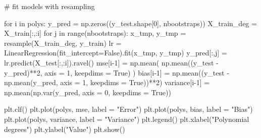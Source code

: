 \documentclass[
  letterpaper,
  DIV=11,
  numbers=noendperiod]{scrartcl}
\newenvironment{Shaded}{\begin{snugshade}}{\end{snugshade}}
\newcommand{\BuiltInTok}[1]{\textcolor[rgb]{0.00,0.23,0.31}{#1}}
\newcommand{\CommentTok}[1]{\textcolor[rgb]{0.37,0.37,0.37}{#1}}
\newcommand{\ControlFlowTok}[1]{\textcolor[rgb]{0.00,0.23,0.31}{#1}}
\newcommand{\DecValTok}[1]{\textcolor[rgb]{0.68,0.00,0.00}{#1}}
\newcommand{\KeywordTok}[1]{\textcolor[rgb]{0.00,0.23,0.31}{#1}}
\newcommand{\NormalTok}[1]{\textcolor[rgb]{0.00,0.23,0.31}{#1}}
\newcommand{\OperatorTok}[1]{\textcolor[rgb]{0.37,0.37,0.37}{#1}}
\newcommand{\StringTok}[1]{\textcolor[rgb]{0.13,0.47,0.30}{#1}}
\newcommand{\VariableTok}[1]{\textcolor[rgb]{0.07,0.07,0.07}{#1}}
\begin{document}
\begin{Shaded}
\begin{Highlighting}[]
\CommentTok{\# fit models with resampling}

\ControlFlowTok{for}\NormalTok{ i }\KeywordTok{in}\NormalTok{ polys:}
\NormalTok{    y\_pred }\OperatorTok{=}\NormalTok{ np.zeros((y\_test.shape[}\DecValTok{0}\NormalTok{], nbootstraps))}
\NormalTok{    X\_train\_deg }\OperatorTok{=}\NormalTok{ X\_train[:,:i]}
    \ControlFlowTok{for}\NormalTok{ j }\KeywordTok{in} \BuiltInTok{range}\NormalTok{(nbootstraps):}
\NormalTok{        x\_tmp, y\_tmp }\OperatorTok{=}\NormalTok{ resample(X\_train\_deg, y\_train)}
\NormalTok{        lr }\OperatorTok{=}\NormalTok{ LinearRegression(fit\_intercept}\OperatorTok{=}\VariableTok{False}\NormalTok{).fit(x\_tmp, y\_tmp)}
\NormalTok{        y\_pred[:,j] }\OperatorTok{=}\NormalTok{ lr.predict(X\_test[:,:i]).ravel()}
\NormalTok{    mse[i}\OperatorTok{{-}}\DecValTok{1}\NormalTok{] }\OperatorTok{=}\NormalTok{ np.mean( np.mean((y\_test }\OperatorTok{{-}}\NormalTok{ y\_pred)}\OperatorTok{**}\DecValTok{2}\NormalTok{, axis }\OperatorTok{=} \DecValTok{1}\NormalTok{, keepdims }\OperatorTok{=} \VariableTok{True}\NormalTok{) )}
\NormalTok{    bias[i}\OperatorTok{{-}}\DecValTok{1}\NormalTok{] }\OperatorTok{=}\NormalTok{ np.mean((y\_test }\OperatorTok{{-}}\NormalTok{ np.mean(y\_pred, axis }\OperatorTok{=} \DecValTok{1}\NormalTok{, keepdims }\OperatorTok{=} \VariableTok{True}\NormalTok{))}\OperatorTok{**}\DecValTok{2}\NormalTok{)}
\NormalTok{    variance[i}\OperatorTok{{-}}\DecValTok{1}\NormalTok{] }\OperatorTok{=}\NormalTok{ np.mean(np.var(y\_pred, axis }\OperatorTok{=} \DecValTok{0}\NormalTok{, keepdims }\OperatorTok{=} \VariableTok{True}\NormalTok{))}

\NormalTok{plt.clf()}
\NormalTok{plt.plot(polys, mse, label }\OperatorTok{=} \StringTok{"Error"}\NormalTok{)}
\NormalTok{plt.plot(polys, bias, label }\OperatorTok{=} \StringTok{"Bias"}\NormalTok{)}
\NormalTok{plt.plot(polys, variance, label }\OperatorTok{=} \StringTok{"Variance"}\NormalTok{)}
\NormalTok{plt.legend()}
\NormalTok{plt.xlabel(}\StringTok{"Polynomial degrees"}\NormalTok{)}
\NormalTok{plt.ylabel(}\StringTok{"Value"}\NormalTok{)}
\NormalTok{plt.show()}
\end{Highlighting}
\end{Shaded}
\end{document}
